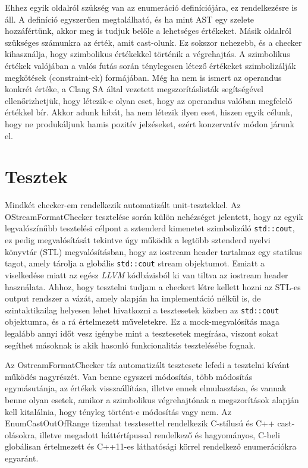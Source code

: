 \documentclass[a4paper,12pt]{report}
\begin{document}
Ehhez egyik oldalról szükség van az enumeráció definíciójára, ez rendelkezésre is áll. A definíció egyszerűen megtalálható, és ha mint AST egy szelete hozzáfértünk, akkor meg is tudjuk belőle a lehetséges értékeket. Másik oldalról szükséges számunkra az érték, amit cast-olunk. Ez sokszor nehezebb, és a checker kihasználja, hogy szimbolikus értékekkel történik a végrehajtás. A szimbolikus értékek valójában a valós futás során ténylegesen létező értékeket szimbolizálják megkötések (constraint-ek) formájában. Még ha nem is ismert az operandus konkrét értéke, a Clang SA által vezetett megszorításlisták segítségével ellenőrizhetjük, hogy létezik-e olyan eset, hogy az operandus valóban megfelelő értékkel bír. Akkor adunk hibát, ha nem létezik ilyen eset, hiszen egyik célunk, hogy ne produkáljunk hamis pozitív jelzéseket, ezért konzervatív módon járunk el.


\chapter{Tesztek}

Mindkét checker-em rendelkezik automatizált unit-tesztekkel. Az OStreamFormatChecker tesztelése során külön nehézséget jelentett, hogy az egyik legvalószínűbb tesztelési célpont a sztenderd kimenetet szimbolizáló \texttt{std::cout}, ez pedig megvalósítását tekintve úgy működik a legtöbb sztenderd nyelvi könyvtár (STL) megvalósításban, hogy az iostream header tartalmaz egy statikus tagot, amely tárolja a globális \texttt{std::cout} stream objektumot. Emiatt a viselkedése miatt az egész \emph{LLVM} kódbázisból ki van tiltva az iostream header használata. Ahhoz, hogy tesztelni tudjam a checkert létre kellett hozni az STL-es output rendszer a vázát, amely alapján ha implementáció nélkül is, de szintaktikailag helyesen lehet hivatkozni a tesztesetek közben az \texttt{std::cout} objektumra, és a rá értelmezett műveletekre. Ez a mock-megvalósítás maga legalább annyi időt vesz igénybe mint a tesztesetek megírása, viszont sokat segíthet másoknak is akik hasonló funkcionalitás tesztelésébe fognak.

Az OstreamFormatChecker tíz automatizált tesztesete lefedi a tesztelni kívánt működés nagyrészét. Van benne egyszeri módosítás, több módosítás egymásutánja, az értékek visszaállítása, illetve ennek elmulasztása, és vannak benne olyan esetek, amikor a szimbolikus végrehajtónak a megszorítások alapján kell kitalálnia, hogy tényleg történt-e módosítás vagy nem. Az EnumCastOutOfRange tizenhat tesztesettel rendelkezik C-stílusú és C++ cast-olásokra, illetve megadott háttértípussal rendelkező és hagyományos, C-beli globálisan értelmezett és C++11-es láthatósági körrel rendelkező enumerációkra egyaránt.
\end{document}
